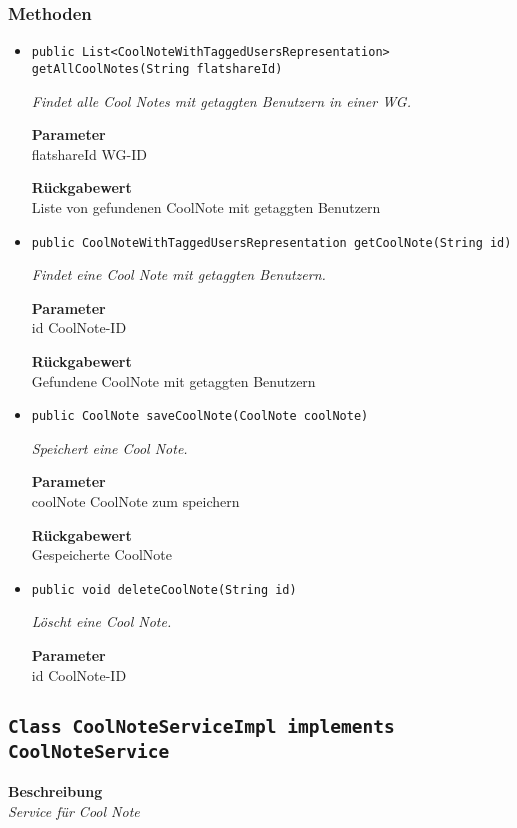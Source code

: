     \subsubsection*{Methoden}
    \begin{itemize}
    	\item{\texttt{public List<CoolNoteWithTaggedUsersRepresentation> getAllCoolNotes(String flatshareId)}}
    	
    	\textit{Findet alle Cool Notes mit getaggten Benutzern in einer WG.}
    	
    	\textbf{Parameter} \\
    	flatshareId WG-ID
    	
    	\textbf{Rückgabewert} \\
    	Liste von gefundenen CoolNote mit getaggten Benutzern        \item{\texttt{public CoolNoteWithTaggedUsersRepresentation getCoolNote(String id)}}
    	
    	\textit{Findet eine Cool Note mit getaggten Benutzern.}
    	
    	\textbf{Parameter} \\
    	id CoolNote-ID
    	
    	\textbf{Rückgabewert} \\
    	Gefundene CoolNote mit getaggten Benutzern        \item{\texttt{public CoolNote saveCoolNote(CoolNote coolNote)}}
    	
    	\textit{Speichert eine Cool Note.}
    	
    	\textbf{Parameter} \\
    	coolNote CoolNote zum speichern
    	
    	\textbf{Rückgabewert} \\
    	Gespeicherte CoolNote        \item{\texttt{public void deleteCoolNote(String id)}}
    	
    	\textit{Löscht eine Cool Note.}
    	
    	\textbf{Parameter} \\
    	id CoolNote-ID
    	
    	
    \end{itemize}
    \subsection{\texttt{Class CoolNoteServiceImpl implements CoolNoteService}}
    \textbf{Beschreibung} \\
    \textit{Service für Cool Note}
